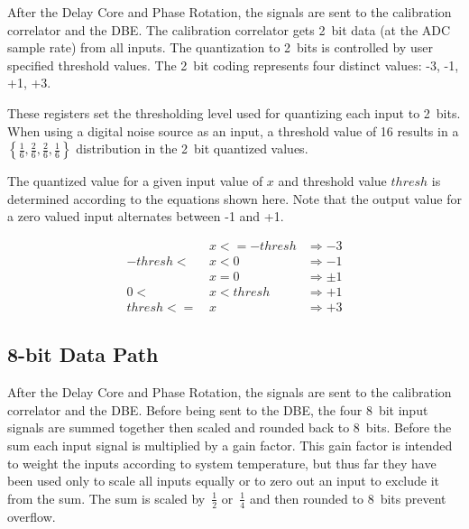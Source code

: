\documentclass[12pt]{article}
\begin{document}
After the Delay Core and Phase Rotation, the signals are sent to the
calibration correlator and the DBE.  The calibration correlator gets 2~bit data
(at the ADC sample rate) from all inputs.  The quantization to 2~bits is
controlled by user specified threshold values.  The 2~bit coding represents
four distinct values: -3, -1, +1, +3.

\begin{description}

  These registers set the thresholding level used for
quantizing each input to 2~bits.  When using a digital noise source as an
input, a threshold value of 16 results in a $\left\{\frac{1}{6}, \frac{2}{6},
\frac{2}{6}, \frac{1}{6}\right\}$ distribution in the 2~bit quantized values.

The quantized value for a given input value of $x$ and threshold value $thresh$
is determined according to the equations shown here.  Note that the output
value for a zero valued input alternates between -1 and +1.

\begin{align*}
           &\,x <= -thresh &\Rightarrow -3 \\
-thresh <  &\,x < 0        &\Rightarrow -1 \\
           &\,x = 0        &\Rightarrow \pm1 \\
      0 <  &\,x < thresh   &\Rightarrow +1 \\
 thresh <= &\,x            &\Rightarrow +3
\end{align*}

\end{description}

  \subsection{8-bit Data Path}

After the Delay Core and Phase Rotation, the signals are sent to the
calibration correlator and the DBE.  Before being sent to the DBE, the four
8~bit input signals are summed together then scaled and rounded back to 8~bits.
Before the sum each input signal is multiplied by a gain factor.  This gain
factor is intended to weight the inputs according to system temperature, but
thus far they have been used only to scale all inputs equally or to zero out an
input to exclude it from the sum.  The sum is scaled by~$\frac{1}{2}$
or~$\frac{1}{4}$ and then rounded to 8~bits prevent overflow.
\end{document}
